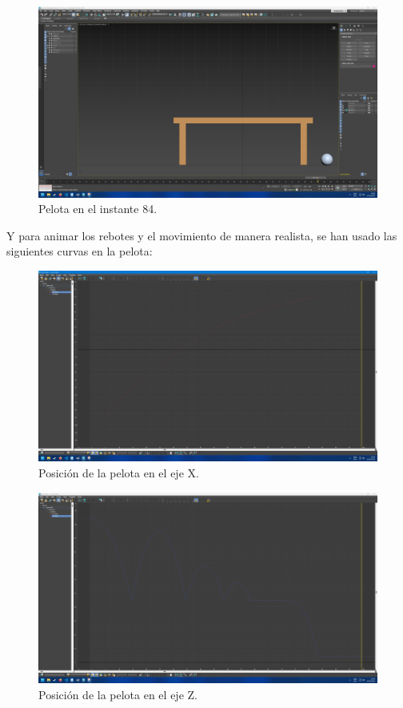 \documentclass{article}
\begin{document}
\begin{figure}[H]
    \centering
    \includegraphics[width=\textwidth]{imagenes/Ejercicio3/keyframes/84.png}
    \caption{Pelota en el instante 84.}
\end{figure}

Y para animar los rebotes y el movimiento de manera realista, se han usado las siguientes curvas en la pelota:

\begin{figure}[H]
    \centering
    \includegraphics[width=\textwidth]{imagenes/Ejercicio3/curvas/red.png}
    \caption{Posición de la pelota en el eje X.}
\end{figure}

\begin{figure}[H]
    \centering
    \includegraphics[width=\textwidth]{imagenes/Ejercicio3/curvas/blue.png}
    \caption{Posición de la pelota en el eje Z.}
\end{figure}
\end{document}
